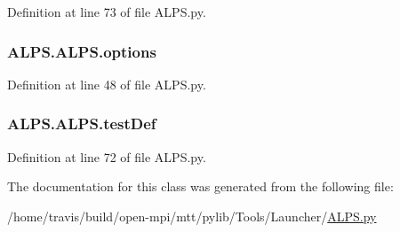 Definition at line 73 of file A\-L\-P\-S.\-py.

\hypertarget{class_a_l_p_s_1_1_a_l_p_s_a24dfa9b508f507c4cb6148f10a081555}{
\subsubsection[{options}]{\setlength{\rightskip}{0pt plus 5cm}A\-L\-P\-S.\-A\-L\-P\-S.\-options}}\label{class_a_l_p_s_1_1_a_l_p_s_a24dfa9b508f507c4cb6148f10a081555}


Definition at line 48 of file A\-L\-P\-S.\-py.

\hypertarget{class_a_l_p_s_1_1_a_l_p_s_a839c4f84a46683221d51004c08345ff2}{
\subsubsection[{test\-Def}]{\setlength{\rightskip}{0pt plus 5cm}A\-L\-P\-S.\-A\-L\-P\-S.\-test\-Def}}\label{class_a_l_p_s_1_1_a_l_p_s_a839c4f84a46683221d51004c08345ff2}


Definition at line 72 of file A\-L\-P\-S.\-py.



The documentation for this class was generated from the following file\-:\begin{DoxyCompactItemize}
\item 
/home/travis/build/open-\/mpi/mtt/pylib/\-Tools/\-Launcher/\hyperlink{_a_l_p_s_8py}{A\-L\-P\-S.\-py}\end{DoxyCompactItemize}
